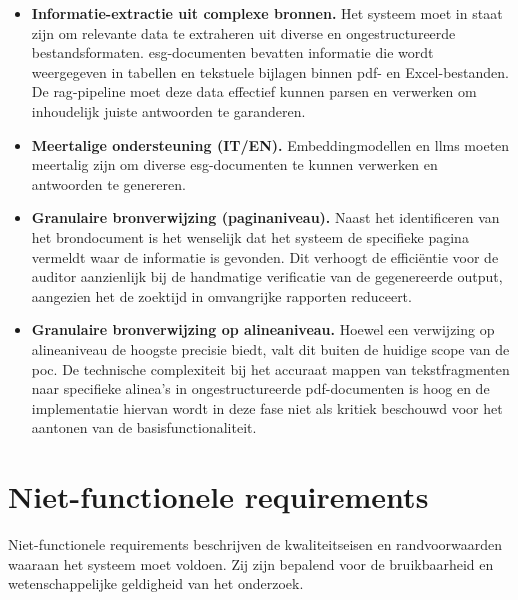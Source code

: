 \begin{itemize}
    \item \textbf{Informatie-extractie uit complexe bronnen.} Het systeem moet in staat zijn om relevante data te extraheren uit diverse en ongestructureerde bestandsformaten. \gls{esg}-documenten bevatten informatie die wordt weergegeven in tabellen en tekstuele bijlagen binnen \gls{pdf}- en Excel-bestanden. De \gls{rag}-pipeline moet deze data effectief kunnen parsen en verwerken om inhoudelijk juiste antwoorden te garanderen.
    \item \textbf{Meertalige ondersteuning (IT/EN).} Embeddingmodellen en \glspl{llm} moeten meertalig zijn om diverse \gls{esg}-documenten te kunnen verwerken en antwoorden te genereren.
    \item \textbf{Granulaire bronverwijzing (paginaniveau).} Naast het identificeren van het brondocument is het wenselijk dat het systeem de specifieke pagina vermeldt waar de informatie is gevonden. Dit verhoogt de efficiëntie voor de auditor aanzienlijk bij de handmatige verificatie van de gegenereerde output, aangezien het de zoektijd in omvangrijke rapporten reduceert.
    \item \textbf{Granulaire bronverwijzing op alineaniveau.} Hoewel een verwijzing op alineaniveau de hoogste precisie biedt, valt dit buiten de huidige scope van de \gls{poc}. De technische complexiteit bij het accuraat mappen van tekstfragmenten naar specifieke alinea's in ongestructureerde \gls{pdf}-documenten is hoog en de implementatie hiervan wordt in deze fase niet als kritiek beschouwd voor het aantonen van de basisfunctionaliteit.
\end{itemize}

\section{Niet-functionele requirements}

Niet-functionele requirements beschrijven de kwaliteitseisen en randvoorwaarden waaraan het systeem moet voldoen. Zij zijn bepalend voor de bruikbaarheid en wetenschappelijke geldigheid van het onderzoek.

